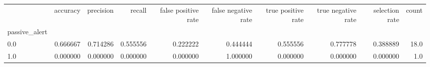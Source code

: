 \begin{tabular}{lrrrrrrrrr}
\toprule
{} &  accuracy &  precision &    recall &  false positive rate &  false negative rate &  true positive rate &  true negative rate &  selection rate &  count \\
passive\_alert &           &            &           &                      &                      &                     &                     &                 &        \\
\midrule
0.0           &  0.666667 &   0.714286 &  0.555556 &             0.222222 &             0.444444 &            0.555556 &            0.777778 &        0.388889 &   18.0 \\
1.0           &  0.000000 &   0.000000 &  0.000000 &             0.000000 &             1.000000 &            0.000000 &            0.000000 &        0.000000 &    1.0 \\
\bottomrule
\end{tabular}
